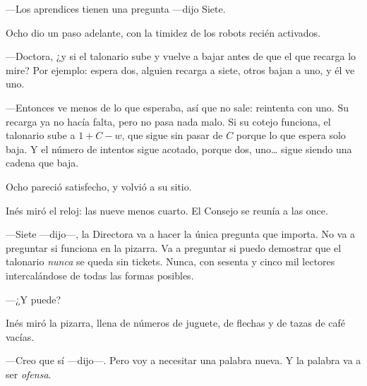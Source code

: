 ---Los aprendices tienen una pregunta ---dijo Siete.

Ocho dio un paso adelante, con la timidez de los robots recién activados.

---Doctora, ¿y si el talonario sube y vuelve a bajar antes de que el que recarga lo mire? Por ejemplo: espera dos, alguien recarga a siete, otros bajan a uno, y él ve uno.

---Entonces ve menos de lo que esperaba, así que no sale: reintenta con uno. Su recarga ya no hacía falta, pero no pasa nada malo. Si su cotejo funciona, el talonario sube a $1 + C - w$, que sigue sin pasar de $C$ porque lo que espera solo baja. Y el número de intentos sigue acotado, porque dos, uno\ldots{} sigue siendo una cadena que baja.

Ocho pareció satisfecho, y volvió a su sitio.

Inés miró el reloj: las nueve menos cuarto. El Consejo se reunía a las once.

---Siete ---dijo---\nobreak, la Directora va a hacer la única pregunta que importa. No va a preguntar si funciona en la pizarra. Va a preguntar si puedo demostrar que el talonario \emph{nunca} se queda sin tickets. Nunca, con sesenta y cinco mil lectores intercalándose de todas las formas posibles.

---¿Y puede?

Inés miró la pizarra, llena de números de juguete, de flechas y de tazas de café vacías.

---Creo que sí ---dijo---\nobreak. Pero voy a necesitar una palabra nueva. Y la palabra va a ser \emph{ofensa}.
